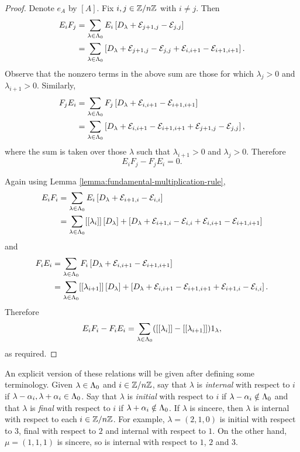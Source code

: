 \documentclass[a4paper, 11pt, twoside]{report}
\begin{document}
\begin{proof}
Denote $e_A$ by $\left[A\right]$. Fix $i,j\in\mathbb{Z}/{n \mathbb{Z}}$ with $i\neq j$. Then
\begin{align*}
E_i F_j &= \sum_{\lambda\in\Lambda_0{}} E_i\left[D_{\lambda} +\mathcal{E}_{j+1,j} -\mathcal{E}_{j,j}\right]\\
&= \sum_{\lambda\in\Lambda_0{}} \left[D_{\lambda} +\mathcal{E}_{j+1,j} -\mathcal{E}_{j,j} +\mathcal{E}_{i,i+1} -\mathcal{E}_{i+1,i+1}\right].
\end{align*}
Observe that the nonzero terms in the above sum are those for which $\lambda_j>0$ and $\lambda_{i+1}>0$. Similarly,
\begin{align*}
F_jE_i &= \sum_{\lambda\in\Lambda_0{}} F_j\left[D_{\lambda} +\mathcal{E}_{i,i+1} -\mathcal{E}_{i+1,i+1}\right]\\
&= \sum_{\lambda\in\Lambda_0{}} \left[D_{\lambda} +\mathcal{E}_{i,i+1} -\mathcal{E}_{i+1,i+1} +\mathcal{E}_{j+1,j} -\mathcal{E}_{j,j}\right],
\end{align*}
where the sum is taken over those $\lambda$ such that $\lambda_{i+1}>0$ and $\lambda_{j}>0$. Therefore
\begin{equation*}
E_iF_j -F_jE_i = 0.
\end{equation*}

Again using Lemma \ref{lemma:fundamental-multiplication-rule},
\begin{align*}
E_iF_i &= \sum_{\lambda\in\Lambda_0{}} E_i\left[D_{\lambda} +\mathcal{E}_{i+1,i} -\mathcal{E}_{i,i}\right]\\
&= \sum_{\lambda\in\Lambda_0{}} [[\lambda_i]]\left[D_{\lambda}\right] +\left[D_{\lambda} +\mathcal{E}_{i+1,i} -\mathcal{E}_{i,i} +\mathcal{E}_{i,i+1} -\mathcal{E}_{i+1,i+1}\right]
\end{align*}
and
\begin{align*}
F_iE_i &= \sum_{\lambda\in\Lambda_0{}} F_i\left[D_{\lambda} +\mathcal{E}_{i,i+1} -\mathcal{E}_{i+1,i+1}\right]\\
&= \sum_{\lambda\in\Lambda_0{}} [[\lambda_{i+1}]]\left[D_{\lambda}\right] +\left[D_{\lambda} +\mathcal{E}_{i,i+1} -\mathcal{E}_{i+1,i+1} +\mathcal{E}_{i+1,i} -\mathcal{E}_{i,i}\right].
\end{align*}
Therefore
\begin{equation*}
E_iF_i -F_iE_i = \sum_{\lambda\in\Lambda_0{}} ([[\lambda_i]] -[[\lambda_{i+1}]])1_\lambda,
\end{equation*}
as required.
\end{proof}

An explicit version of these relations will be given after defining some terminology. Given $\lambda\in\Lambda_0{}$ and $i\in\mathbb{Z}/{n \mathbb{Z}}$, say that $\lambda$ is \emph{internal} with respect to $i$ if $\lambda-\alpha_i,\lambda+\alpha_i\in\Lambda_0{}$. Say that $\lambda$ is \emph{initial} with respect to $i$ if $\lambda-\alpha_i\notin\Lambda_0{}$ and that $\lambda$ is \emph{final} with respect to $i$ if $\lambda+\alpha_i\notin\Lambda_0{}$. If $\lambda$ is sincere, then $\lambda$ is internal with respect to each $i\in\mathbb{Z}/{n \mathbb{Z}}$. For example, $\lambda=(2,1,0)$ is initial with respect to $3$, final with respect to $2$ and internal with respect to $1$. On the other hand, $\mu=(1,1,1)$ is sincere, so is internal with respect to $1$, $2$ and $3$.
\end{document}
